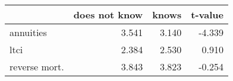 \begin{tabular}{lrrr}
\toprule
{} &  does not know &  knows &  t-value \\
\midrule
annuities     &          3.541 &  3.140 &   -4.339 \\
ltci          &          2.384 &  2.530 &    0.910 \\
reverse mort. &          3.843 &  3.823 &   -0.254 \\
\bottomrule
\end{tabular}
